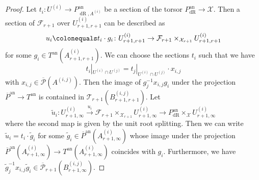 \documentclass[10pt, oneside]{amsart}
\newcommand{\defeq}{\colonequals}
\renewcommand{\tilde}{\widetilde}
\numberwithin{equation}{subsection}
\theoremstyle{definition}
\theoremstyle{remark}
\newcommand{\opn}[1]{\operatorname{#1}}
\begin{document}
\begin{proof}
    Let $t_i \colon U^{(i)} \to P_{\opn{dR}, A^{(i)}}^{\opn{an}}$ be a section of the torsor $P_{\opn{dR}}^{\opn{an}} \to \mathcal{X}$. Then a section of $\mathcal{F}_{r+1}$ over $U_{r+1, r+1}^{(i)}$ can be described as 
    \[
    u_i \defeq t_i \cdot g_i \colon U_{r+1, r+1}^{(i)} \to \mathcal{F}_{r+1} \times_{\mathcal{X}_{r+1}} U_{r+1, r+1}^{(i)}
    \]
    for some $g_i \in T^{\opn{an}}(A_{r+1, r+1}^{(i)})$. We can choose the sections $t_i$ such that we have 
    \[
    t_i|_{U^{(i)} \cap U^{(j)}} = t_j|_{U^{(i)} \cap U^{(j)}} \cdot x_{i, j}
    \]
    with $x_{i, j} \in \overline{\mathcal{P}}(A^{(i, j)})$. Then the image of $g_j^{-1} x_{i, j} g_i$ under the projection $\overline{P}^{\opn{an}} \to T^{\opn{an}}$ is contained in $\mathcal{T}_{r+1}(B^{(i, j)}_{r+1, r+1})$. Let 
    \[
    \tilde{u}_i \colon U_{r+1, \infty}^{(i)} \xrightarrow{u_i} \mathcal{F}_{r+1} \times_{\mathcal{X}_{r+1}} U_{r+1, \infty}^{(i)} \to P_{\opn{dR}}^{\opn{an}} \times_{\mathcal{X}} U_{r+1, \infty}^{(i)}
    \]
    where the second map is given by the unit root splitting. Then we can write $\tilde{u}_i = t_i \cdot \tilde{g}_i$ for some $\tilde{g}_i \in \overline{P}^{\opn{an}}(A^{(i)}_{r+1, \infty})$ whose image under the projection $\overline{P}^{\opn{an}}(A^{(i)}_{r+1, \infty}) \to T^{\opn{an}}(A^{(i)}_{r+1, \infty})$ coincides with $g_i$. Furthermore, we have $\tilde{g}_j^{-1} x_{i, j} \tilde{g}_i \in \overline{\mathcal{P}}_{r+1}(B_{r+1, \infty}^{(i, j)})$.


\end{proof}
\end{document}
